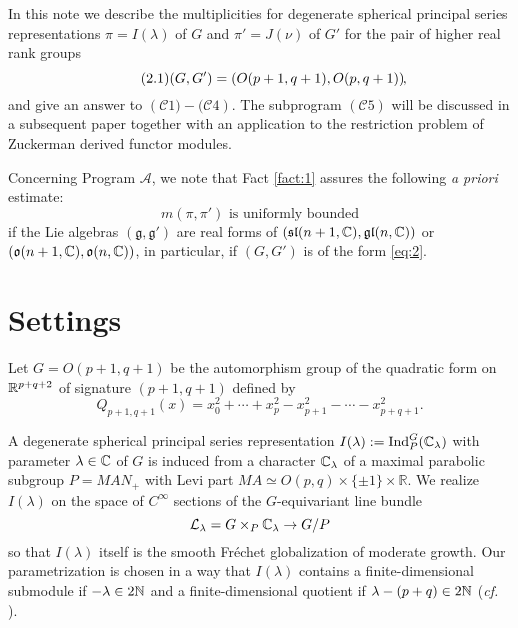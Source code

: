 \documentclass[reqno,12pt]{pja00} %
\newcommand{\assign}{:=}
\newcommand{\tmop}[1]{\ensuremath{\operatorname{#1}}}
\newcommand{\Ind}{\mbox{\normalfont Ind}}
\theoremstyle{definition}
\theoremstyle{exampstyle} \newtheorem{examp}[theorem]{Theorem}
\newcommand{\tmtextbf}[1]{{\bfseries{#1}}}
\begin{document}

In this note we describe the multiplicities for degenerate spherical principal series representations $\pi=I(\lambda)$ of $G$ and $\pi'=J(\nu)$ of $G'$ for the pair
of higher real rank groups\begin{equation}\tag{2.1}\label{eq:2}
	(G,G')=\left( O(p+1,q+1),O(p,q+1) \right)\kern-0.1cm,
\end{equation}
and give an answer to $\left( \mathcal{C}1)-(\mathcal{C}4 \right)$. The subprogram $\left( \mathcal{C}5 \right)$ will be discussed
in a subsequent paper together with an application to the restriction problem of Zuckerman derived functor modules.

Concerning Program $\mathcal{A}$, we note that Fact \ref{fact:1} assures the following {\it a priori} estimate:\begin{equation*}
	m(\pi,\pi')\mbox{ is uniformly bounded}
\end{equation*}
if the Lie algebras $(\mathfrak{g},\mathfrak{g}')$ are real forms of $(\mathfrak{sl}(n+1,\mathbb{C}),\mathfrak{gl}(n,\mathbb{C}))$
or $(\mathfrak{o}(n+1,\mathbb{C}),\mathfrak{o}(n,\mathbb{C}))$, in particular, if $(G,G')$ is of the form \eqref{eq:2}.
\section{Settings}
Let $G=O(p+1,q+1)$ be the automorphism group of the quadratic form
on $\mathbb{R}^{p+q+2}$ of signature $(p+1,q+1)$ defined by
\begin{equation*}
	Q_{p+1,q+1}(x)
		=x_0^2+\cdots+x_{p}^2-x_{p+1}^2-\cdots-x_{p+q+1}^2.
\end{equation*}

A degenerate spherical principal series representation $I(\lambda):=\Ind_P^G(\C_{\lambda})$ with parameter $\lambda\in\mathbb{C}$ of $G$ is induced from
a character $\mathbb{C}_\lambda$ of a maximal parabolic subgroup $P=MAN_+$
with Levi part
$M A \simeq O (p, q) \times \{ \pm 1 \} \times \mathbb{R}$.
We realize $I(\lambda)$ on the space of $C^\infty$ sections
of the $G$-equivariant line bundle\[
	\mathcal{L}_\lambda=G\times_{P}\mathbb{C}_\lambda\to G/P
\]
so that $I(\lambda)$ itself is the smooth Fr\'echet globalization of moderate growth.
Our parametrization is chosen in a way that
$I(\lambda)$ contains a finite-dimensional submodule if $-\lambda\in2\mathbb{N}$ and a finite-dimensional quotient if $\lambda-\left( p+q\right)\in2\mathbb{N}$ ({\it cf.} \cite{howe1993homogeneous}).
\end{document}

